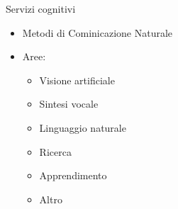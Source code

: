%
\begin{frame}[t]{Servizi cognitivi}
\begin{itemize}
	\item Metodi di Cominicazione Naturale
	\item Aree:
	\begin{itemize}
		\item Visione artificiale
		\item Sintesi vocale
		\item Linguaggio naturale
		\item Ricerca
		\item Apprendimento
		\item Altro
	\end{itemize}
\end{itemize}
\end{frame}
%
